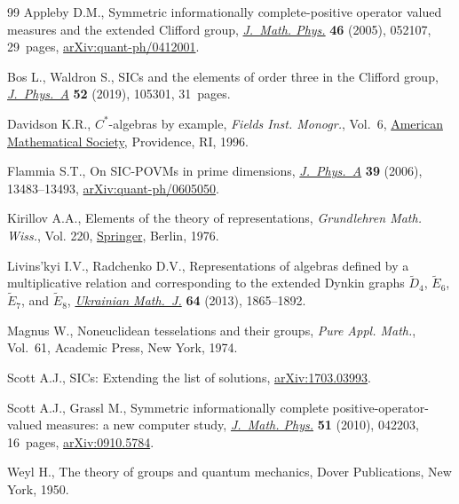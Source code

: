 \documentclass[11pt]{article}
\numberwithin{equation}{section}
\numberwithin{equation}{section}
\begin{document}
\begin{thebibliography}{99}
Appleby D.M., Symmetric informationally complete-positive operator valued
 measures and the extended {C}lifford group, \href{https://doi.org/10.1063/1.1896384}{\textit{J.~Math. Phys.}}
 \textbf{46} (2005), 052107, 29~pages, \href{https://arxiv.org/abs/quant-ph/0412001}{arXiv:quant-ph/0412001}.

Bos L., Waldron S., S{IC}s and the elements of order three in the {C}lifford
 group, \href{https://doi.org/10.1088/1751-8121/aafff3}{\textit{J.~Phys.~A}} \textbf{52} (2019), 105301, 31~pages.

Davidson K.R., {$C^*$}-algebras by example, \textit{Fields Inst. Monogr.},
 Vol.~6, \href{https://doi.org/10.1090/fim/006}{American Mathematical Society}, Providence, RI, 1996.

Flammia S.T., On {SIC}-{POVM}s in prime dimensions, \href{https://doi.org/10.1088/0305-4470/39/43/007}{\textit{J.~Phys.~A}}
 \textbf{39} (2006), 13483--13493, \href{https://arxiv.org/abs/quant-ph/0605050}{arXiv:quant-ph/0605050}.

Kirillov A.A., Elements of the theory of representations, \textit{Grundlehren
 Math. Wiss.}, Vol. 220, \href{https://doi.org/10.1007/978-3-642-66243-0}{Springer}, Berlin, 1976.

Livins'kyi I.V., Radchenko D.V., Representations of algebras defined by a
 multiplicative relation and corresponding to the extended {D}ynkin graphs
 {$\tilde{D}_4$}, {$\tilde{E}_6$}, {$\tilde{E}_7$}, and {$\tilde{E}_8$},
 \href{https://doi.org/10.1007/s11253-013-0757-y}{\textit{Ukrainian Math.~J.}} \textbf{64} (2013), 1865--1892.

Magnus W., Noneuclidean tesselations and their groups, \textit{Pure Appl.
 Math.}, Vol.~61, Academic Press, New York, 1974.

Scott A.J., {SIC}s: {E}xtending the list of solutions, \href{https://arxiv.org/abs/1703.03993}{arXiv:1703.03993}.

Scott A.J., Grassl M., Symmetric informationally complete
 positive-operator-valued measures: a new computer study, \href{https://doi.org/10.1063/1.3374022}{\textit{J.~Math.
 Phys.}} \textbf{51} (2010), 042203, 16~pages, \href{https://arxiv.org/abs/0910.5784}{arXiv:0910.5784}.

Weyl H., The theory of groups and quantum mechanics, Dover Publications, New
 York, 1950.

\end{thebibliography}
\end{document}
